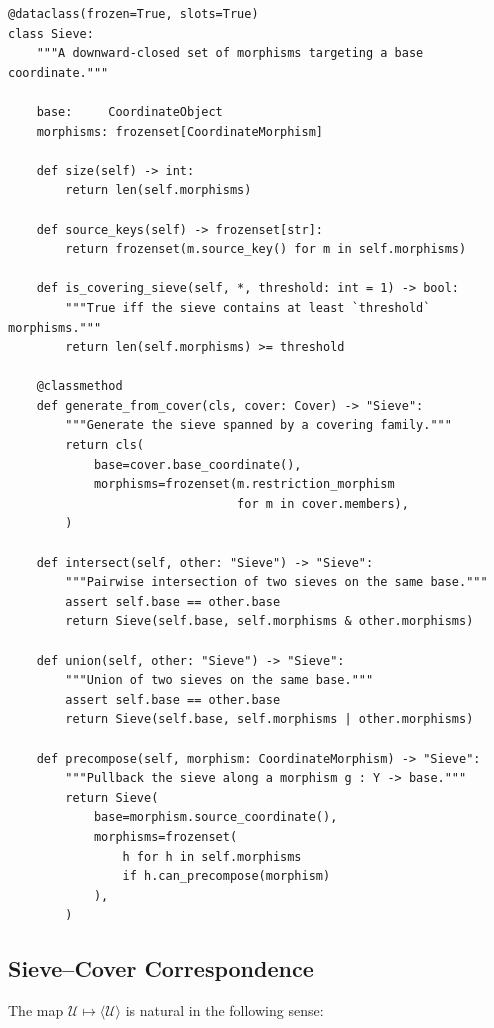\documentclass[11pt]{article}
\begin{document}
\begin{lstlisting}[style=jugeo-python,
  caption={\texttt{Sieve} class from \texttt{src/jugeo/geometry/covers.py}.},
  label={lst:sieve}]
@dataclass(frozen=True, slots=True)
class Sieve:
    """A downward-closed set of morphisms targeting a base coordinate."""

    base:     CoordinateObject
    morphisms: frozenset[CoordinateMorphism]

    def size(self) -> int:
        return len(self.morphisms)

    def source_keys(self) -> frozenset[str]:
        return frozenset(m.source_key() for m in self.morphisms)

    def is_covering_sieve(self, *, threshold: int = 1) -> bool:
        """True iff the sieve contains at least `threshold` morphisms."""
        return len(self.morphisms) >= threshold

    @classmethod
    def generate_from_cover(cls, cover: Cover) -> "Sieve":
        """Generate the sieve spanned by a covering family."""
        return cls(
            base=cover.base_coordinate(),
            morphisms=frozenset(m.restriction_morphism
                                for m in cover.members),
        )

    def intersect(self, other: "Sieve") -> "Sieve":
        """Pairwise intersection of two sieves on the same base."""
        assert self.base == other.base
        return Sieve(self.base, self.morphisms & other.morphisms)

    def union(self, other: "Sieve") -> "Sieve":
        """Union of two sieves on the same base."""
        assert self.base == other.base
        return Sieve(self.base, self.morphisms | other.morphisms)

    def precompose(self, morphism: CoordinateMorphism) -> "Sieve":
        """Pullback the sieve along a morphism g : Y -> base."""
        return Sieve(
            base=morphism.source_coordinate(),
            morphisms=frozenset(
                h for h in self.morphisms
                if h.can_precompose(morphism)
            ),
        )
\end{lstlisting}

\subsection{Sieve–Cover Correspondence}

The map $\mathcal{U} \mapsto \langle \mathcal{U} \rangle$ is
natural in the following sense:
\end{document}
